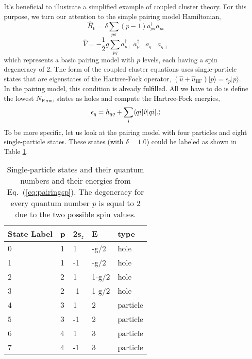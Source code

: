 \documentclass[thesis.tex]{subfiles}
\begin{document}
It's beneficial to illustrate a simplified example of coupled cluster theory. For this purpose, we turn our attention to the simple pairing model Hamiltonian,
\begin{equation} \label{eq:sppairing}
  \hat{H}_0 = \delta \sum_{p \sigma} (p-1) a^{\dagger}_{p \sigma} a_{p \sigma}
\end{equation}
\begin{equation} \label{eq:intpairing}
  \hat{V} = -\frac{1}{2}g \sum_{pq} a^{\dagger}_{p+}a^{\dagger}_{p-}a_{q-}a_{q+}
\end{equation}
which represents a basic pairing model with $p$ levels, each having a spin degeneracy of 2. The form of the coupled cluster equations uses single-particle states that are eigenstates of the Hartree-Fock operator, $\left(\hat{u}+\hat{u}_{\text{HF}}\right)\vert p\rangle=\epsilon_{p}\vert p\rangle$. In the pairing model, this condition is already fulfilled. All we have to do is define the lowest $N_{\mathrm{\mathrm{Fermi}}}$ states as holes and compute the Hartree-Fock energies,
\begin{equation}\label{eq:pairingsp}
  \epsilon_q = h_{qq} + \sum_{i} \langle qi|\hat{v}|qi | .\rangle
\end{equation}
To be more specific, let us look at the pairing model with four particles and eight single-particle states. These states (with $\delta =1.0$) could be labeled as shown in Table \ref{tab:pairingmodelsp}.
\begin{table}
  \caption{Single-particle states and their quantum numbers and their energies from Eq.~(\ref{eq:pairingsp}). The degeneracy for every quantum number $p$ is equal to 2 due to the two possible spin values.} \label{tab:pairingmodelsp}
  \begin{center}
    \begin{tabular}{| l | l | l | l | l |}
      \hline State Label & p & 2s$_z$ & E & type\\ \hline 0 & 1 & 1 &
      -g/2 & hole \\ \hline 1 & 1 & -1 & -g/2 & hole \\ \hline 2 & 2 &
      1 & 1-g/2 & hole \\ \hline 3 & 2 & -1 & 1-g/2 & hole \\ \hline 4
      & 3 & 1 & 2 & particle \\ \hline 5 & 3 & -1 & 2 & particle
      \\ \hline 6 & 4 & 1 & 3 & particle \\ \hline 7 & 4 & -1 & 3 &
      particle \\ \hline
    \end{tabular}
  \end{center}
\end{table}
\end{document}
